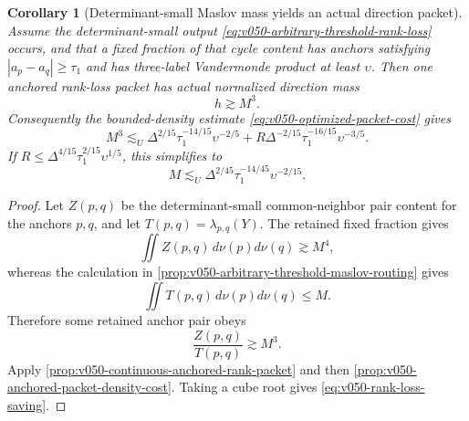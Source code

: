 \documentclass[10pt]{article}
\newtheorem{corollary}[theorem]{Corollary}
\begin{document}
\begin{corollary}[Determinant-small Maslov mass yields an actual direction packet]
\label{cor:v050-rank-loss-cycle-to-packet}
Assume the determinant-small output
\eqref{eq:v050-arbitrary-threshold-rank-loss} occurs, and that a fixed fraction of that cycle content
has anchors satisfying \(|a_p-a_q|\ge\tau_1\) and has three-label Vandermonde product at least
\(\upsilon\).  Then one anchored rank-loss packet has actual normalized direction mass
\begin{equation}
\label{eq:v050-rank-loss-packet-lower}
\boxed{h\gtrsim M^3.}
\end{equation}
Consequently the bounded-density estimate
\eqref{eq:v050-optimized-packet-cost} gives
\begin{equation}
\label{eq:v050-rank-loss-mass-comparison}
\boxed{
M^3
\lesssim_U
\Delta^{2/15}\tau_1^{-14/15}\upsilon^{-2/5}
+
R\Delta^{-2/15}\tau_1^{-16/15}\upsilon^{-3/5}.
}
\end{equation}
If
\(R\le\Delta^{4/15}\tau_1^{2/15}\upsilon^{1/5}\), this simplifies to
\begin{equation}
\label{eq:v050-rank-loss-saving}
\boxed{
M
\lesssim_U
\Delta^{2/45}\tau_1^{-14/45}\upsilon^{-2/15}.
}
\end{equation}
\end{corollary}

\begin{proof}
Let \(Z(p,q)\) be the determinant-small common-neighbor pair content for the anchors \(p,q\), and
let \(T(p,q)=\lambda_{p,q}(Y)\).  The retained fixed fraction gives
\[
\iint Z(p,q)\,d\nu(p)d\nu(q)
\gtrsim
M^4,
\]
whereas the calculation in
\cref{prop:v050-arbitrary-threshold-maslov-routing} gives
\[
\iint T(p,q)\,d\nu(p)d\nu(q)
\le
M.
\]
Therefore some retained anchor pair obeys
\[
\frac{Z(p,q)}{T(p,q)}
\gtrsim
M^3.
\]
Apply \cref{prop:v050-continuous-anchored-rank-packet} and then
\cref{prop:v050-anchored-packet-density-cost}.  Taking a cube root gives
\eqref{eq:v050-rank-loss-saving}.
\end{proof}
\end{document}
